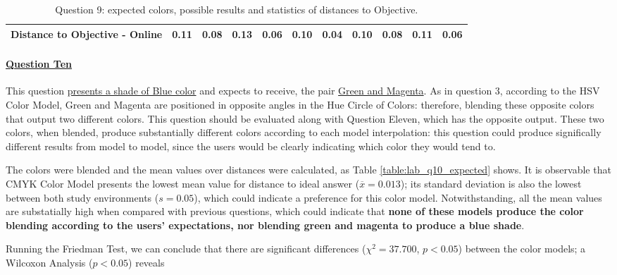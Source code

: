 \begin{table}[H]
{\begin{tabular}{lccccccccccccc}
    \multicolumn{4}{l}{Distance to Objective - Online}                                                                                               & \multicolumn{1}{|c}{0.11}        & \multicolumn{1}{c|}{0.08}    & \multicolumn{1}{|c}{0.13}        & \multicolumn{1}{c|}{0.06}    & \multicolumn{1}{|c}{\textbf{0.10}}       & \multicolumn{1}{c|}{0.04}    & \multicolumn{1}{|c}{\textbf{0.10}}        & \multicolumn{1}{c|}{0.08}    & \multicolumn{1}{|c}{0.11}       & \multicolumn{1}{c|}{0.06}    \\ \hline
    \end{tabular}}
  \caption[Question 9, with expected Results.]{Question 9: expected colors, possible results and statistics of distances to Objective.}
  \label{table:lab_q9_expected}
\end{table}
%
\paragraph{\ul{Question Ten}}
%
This question \ul{presents a shade of Blue color} and expects to receive, the pair \ul{Green and Magenta}. As in question 3, according to the HSV Color Model, Green and Magenta are positioned in
opposite angles in the Hue Circle of Colors: therefore, blending these opposite colors that output two different colors. This question should be evaluated along with Question Eleven, which has
the opposite output.
These two colors, when blended, produce substantially different colors according to each model interpolation: this question could produce significally different results from model to model,
since the users would be clearly indicating which color they would tend to. \par
%
The colors were blended and the mean values over distances were calculated, as Table \ref{table:lab_q10_expected} shows. It is observable that CMYK Color Model presents
the lowest mean value for distance to ideal answer ($\overline{x} = 0.013$); its standard deviation is also the lowest between both study environments ($s = 0.05$), which could indicate a preference
for this color model. Notwithstanding, all the mean values are substatially high when compared with previous questions, which could indicate that \textbf{none of these models produce the color blending according
to the users' expectations, nor blending green and magenta to produce a blue shade}. \par
%
Running the Friedman Test, we can conclude that there are significant differences ($\chi^2 = 37.700$, $p < 0.05$) between the color models; a Wilcoxon Analysis ($p < 0.05$) reveals
